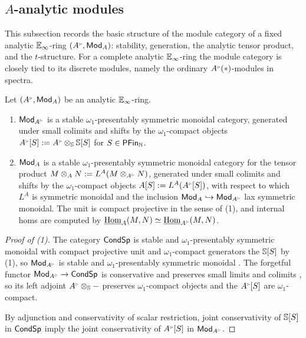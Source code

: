 \subsection{\texorpdfstring{$A$}{A}-analytic modules}\label{subsec: analytic modules}
This subsection records the basic structure of the module category of a fixed analytic $\mathbb{E}_{\infty}$-ring $(A^{\tri},\Mod_{A})$: stability, generation, the analytic tensor product, and the $t$-structure. For a complete analytic $\mathbb{E}_{\infty}$-ring the module category is closely tied to its discrete modules, namely the ordinary $A^{\tri}(*)$-modules in spectra.
\begin{proposition}\label{prop: stability of A-analytic modules}\label{prop: A-analytic tensor product}
    Let $(A^{\tri},\Mod_{A})$ be an analytic $\mathbb{E}_{\infty}$-ring. 
    \begin{enumerate}
        \item $\Mod_{A^{\tri}}$ is a stable $\omega_{1}$-presentably symmetric monoidal category, generated under small colimits and shifts by the $\omega_{1}$-compact objects $A^{\tri}[S]:=A^{\tri}\otimes_{\Sph}\Sph[S]$ for $S\in\mathsf{PFin}_{\mathbb{N}}$. 
        \item $\mathsf{Mod}_{A}$ is a stable $\omega_{1}$-presentably symmetric monoidal category for the tensor product $M\otimes_{A}N:=L^{A}(M\otimes_{A^{\tri}}N)$, generated under small colimits and shifts by the $\omega_{1}$-compact objects $A[S]:=L^{A}(A^{\tri}[S])$, with respect to which $L^{A}$ is symmetric monoidal and the inclusion $\Mod_{A}\hookrightarrow\Mod_{A^{\tri}}$ lax symmetric monoidal. The unit is compact projective in the sense of  (1), and internal homs are computed by $\intHom_{A}(M,N)\simeq\intHom_{A^{\tri}}(M,N)$. 
    \end{enumerate}
\end{proposition}
\begin{proof}[Proof of (1)]
    The category $\mathsf{Cond}\mathsf{Sp}$ is stable and $\omega_{1}$-presentably symmetric monoidal with compact projective unit and $\omega_{1}$-compact generators the $\mathbb{S}[S]$ by  (1), so $\Mod_{A^{\tri}}$ is stable \cite[Prop. 7.1.1.4]{HA} and $\omega_{1}$-presentably symmetric monoidal \cite[Lem. 2.2]{AokiHigherLimits}. The forgetful functor $\Mod_{A^{\tri}}\to\Cond\Sp$ is conservative and preserves small limits and colimits \cite[Cor. 4.2.3.5]{HA}, so its left adjoint $A^{\tri}\otimes_{\Sph}-$ preserves $\omega_{1}$-compact objects and the $A^{\tri}[S]$ are $\omega_{1}$-compact. 
    
    By adjunction and conservativity of scalar restriction, joint conservativity of $\mathbb{S}[S]$ in $\mathsf{Cond}\mathsf{Sp}$ imply the joint conservativity of $A^{\tri}[S]$ in $\Mod_{A^{\tri}}$. 
\end{proof}
